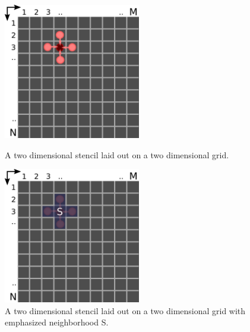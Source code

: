 \begin{figure}[h]
	\begin{minipage}{.5\columnwidth}
		\centering
		\includegraphics[height=16em]{drawings/model-stencil-general.png}
		\caption{A two dimensional stencil laid out on a two dimensional grid.}
		\label{fig:model-stencil-general}
		\vspace{1em}
	\end{minipage}
	\begin{minipage}{.5\columnwidth}
		\centering
		\includegraphics[height=16em]{drawings/model-stencil-neighbourhood-array.png}
		\caption{A two dimensional stencil laid out on a two dimensional grid with emphasized neighborhood S.}
		\label{fig:model-stencil2}
	\end{minipage}
\end{figure}



